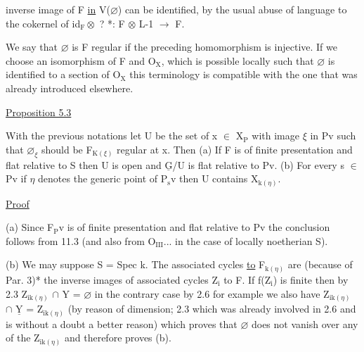 
inverse image of F \uline{in} V($\varnothing$) can be identified, by the usual abuse
of language to the cokernel of id$_{\mathrm{F}}\otimes$ ? *: F $\otimes$ L-1 $\rightarrow$ F.

We say that $\varnothing$ is F regular if the preceding homomorphism is
injective.  If we choose an isomorphism of F and O$_{\mathrm{X}}$, which is
possible locally such that $\varnothing$ is identified to a section of O$_{\mathrm{X}}$ this
terminology is compatible with the one that was already introduced
elsewhere.

\uline{Proposition 5.3}

With the previous notations let U be the set of x $\in$ X$_{\mathrm{P}}$ with
image $\xi$ in Pv such that $\varnothing_{\xi}$ should be F$_{\mathrm{K}(\xi)}$ regular at x.  Then (a)
If F is of finite presentation and flat relative to S then U is
open and $\underline{\mathrm{G}}$/U is flat relative to Pv.  (b) For every s $\in$ Pv if $\eta$
denotes the generic point of P$_{\mathrm{s}}$v then U contains X$_{\mathrm{k}(\eta)}$.

\uline{Proof}

(a) Since F$_{\mathrm{P}}$v is of finite presentation and flat relative to
Pv the conclusion follows from 11.3 (and also from O$_{\mathrm{III}}$... in the
case of locally noetherian S).

(b) We may suppose S = Spec k.  The associated cycles \uline{to} F$_{\mathrm{k}(\eta)}$
are (because of Par. 3)* the inverse images of associated cycles
Z$_{\mathrm{i}}$ to F.  If f(Z$_{\mathrm{i}}$) is finite then by 2.3 Z$_{\mathrm{ik}(\eta)}$ $\cap$ Y = $\varnothing$ in the
contrary case by 2.6 for example we also have Z$_{\mathrm{ik}(\eta)}$ $\cap$ $\underline{\mathrm{Y}}$ = Z$_{\mathrm{ik}(\eta)}$
(by reason of dimension; 2.3 which was already involved in 2.6 and
is without a doubt a better reason) which proves that $\varnothing$ does not
vanish over any of the Z$_{\mathrm{ik}(\eta)}$ and therefore proves (b).


